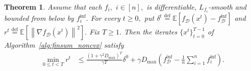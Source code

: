 \documentclass{article}
\newcommand{\eqdef}{\stackrel{\text{def}}{=}}
\newtheorem{theorem}{Theorem}
\theoremstyle{plain}
\newcommand{\tf}{f_{\mathcal{D}}}
\theoremstyle{plain}
\theoremstyle{definition}
\theoremstyle{remark}
\begin{document}
\begin{theorem}
	Assume that each $f_i,$ $i\in[n],$ is differentiable, $L_{f_i}$-smooth and bounded from below by $f_i^{\inf}.$ For every $t\geq 0,$ put $\delta^t\eqdef\mathbb{E}\left[\tf(x^t)-\tf^{\inf}\right]$ and $r^t\eqdef\mathbb{E}\left[\left\|\nabla \tf(x^t)\right\|^2\right].$ Fix $T\geq 1.$ Then the iterates $\{x^t\}_{t=0}^{T-1}$ of Algorithm~\ref{alg:finsum_noncvx} satisfy
	\begin{equation}\label{eq:main_noncvx_finite_sum}
		\begin{split}
			\min_{0 \leq t < T}r^t &\leq \frac{\left(1+\gamma^2D_{\max}\right)^T}{\gamma T}\delta^0 + \gamma D_{\max}\left(\tf^{\inf} - \frac{1}{n}\sum_{i=1}^{n}f^{\inf}_i\right).
		\end{split}
	\end{equation}
\end{theorem}
\end{document}
